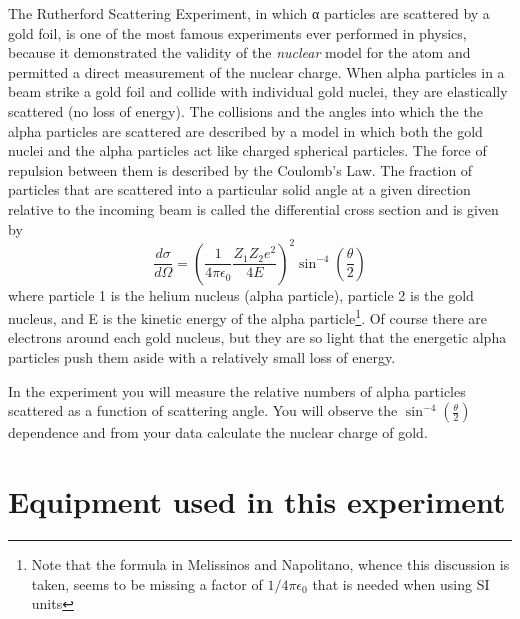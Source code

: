 \documentclass{../lab}
\begin{document}
The Rutherford Scattering Experiment, in which α particles are scattered by a gold foil, is one of the most famous experiments ever performed in physics, because it demonstrated the validity of the \emph{nuclear} model for the atom and permitted a direct measurement of the nuclear charge. When alpha particles in a beam strike a gold foil and collide with individual gold nuclei, they are elastically scattered (no loss of energy). The collisions and the angles into which the the alpha particles are scattered are described by a model in which both the gold nuclei and the alpha particles act like charged spherical particles. The force of repulsion between them is described by the Coulomb's Law. The fraction of particles that are scattered into a particular solid angle at a given direction relative to the incoming beam is called the differential cross section and is given by
\[
\frac{d\sigma}{d\Omega} = \left( \frac{1}{4 \pi \epsilon_0} \frac{Z_1 Z_2 e^2}{4E} \right)^2 \sin^{-4} \left(\frac{\theta}{2}\right)
\]
where particle 1 is the helium nucleus (alpha particle), particle 2 is the gold nucleus, and E is the kinetic energy of the alpha particle\footnote{Note that the formula in Melissinos and Napolitano, whence this discussion is taken, seems to be missing a factor of $1/4 \pi \epsilon_0$ that is needed when using SI units}. Of course there are electrons around each gold nucleus, but they are so light that the energetic alpha particles push them aside with a relatively small loss of energy.

In the experiment you will measure the relative numbers of alpha particles scattered as a function of scattering angle. You will observe the $\sin^{-4} \left(\frac{\theta}{2}\right)$ dependence and from your data calculate the nuclear charge of gold.

\section{Equipment used in this experiment}
\end{document}
